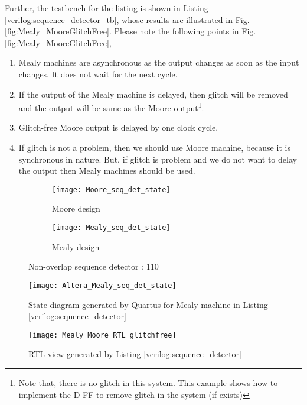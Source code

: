 Further, the testbench for the listing is shown in Listing \ref{verilog:sequence_detector_tb}, whose results are illustrated in Fig. \ref{fig:Mealy_MooreGlitchFree}. Please note the following points in Fig. \ref{fig:Mealy_MooreGlitchFree},
\begin{enumerate}
	\item Mealy machines are asynchronous as the output changes as soon as the input changes. It does not wait for the next cycle. 
	\item If the output of the Mealy machine is delayed, then glitch will be removed and the output will be same as the Moore output\footnote{Note that, there is no glitch in this system. This example shows how to implement the D-FF to remove glitch in the system (if exists)}. 
	\item Glitch-free Moore output is delayed by one clock cycle. 
	\item If glitch is not a problem, then we should use Moore machine, because it is synchronous in nature. But, if glitch is problem and we do not want to delay the output then Mealy machines should be used. 
\end{enumerate}

\begin{figure*}[!h]
	\begin{subfigure}[t]{0.5\textwidth}
		\centering
		\texttt{[image: Moore\_seq\_det\_state]}
		\caption{Moore design}
		
	\end{subfigure} %
	\begin{subfigure}[t]{0.5\textwidth}
		\centering
		\texttt{[image: Mealy\_seq\_det\_state]}
		\caption{Mealy design}
		\label{subfig:Mealy_seq_det_state}
	\end{subfigure}		
	\caption{Non-overlap sequence detector : 110}
	\label{fig:non-overlap-design}%
\end{figure*}

\begin{figure}[!h]
	\centering
	\texttt{[image: Altera\_Mealy\_seq\_det\_state]}
	\caption{State diagram generated by Quartus for Mealy machine in Listing \ref{verilog:sequence_detector}}
	\label{fig:Altera_Mealy_seq_det_state}
\end{figure}


\begin{figure}[!h]
	\centering
	\texttt{[image: Mealy\_Moore\_RTL\_glitchfree]}
	\caption{RTL view generated by Listing \ref{verilog:sequence_detector}}
	\label{fig:Mealy_Moore_RTL_glitchfree}
\end{figure}

